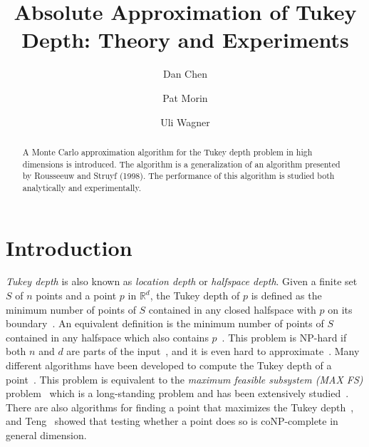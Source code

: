 \documentclass [letterpaper] {article}
\title{Absolute Approximation of Tukey Depth: \newline Theory and Experiments}
\author{Dan Chen \and Pat Morin \and Uli Wagner}
\date{}
\begin{document}
\maketitle


\begin{abstract}
  A Monte Carlo approximation algorithm for the Tukey depth problem in
  high dimensions is introduced. The algorithm is a generalization of
  an algorithm presented by Rousseeuw and Struyf (1998). The performance
  of this algorithm is studied both analytically and experimentally.
\end{abstract}


\section{Introduction}
\label{sec:intro}

\emph{Tukey depth} is also known as \emph{location depth} or \emph{halfspace depth}. Given a finite set $S$ of $n$ points and a point $p$ in $\mathbb{R}^{d}$, the Tukey depth of $p$ is defined as the minimum number of points of $S$ contained in any closed halfspace with $p$ on its boundary~\cite{Hodges,Tukey}. An equivalent definition is the minimum number of points of $S$ contained in any halfspace which also contains $p$~\cite{Bremner08}. This problem is NP-hard if both $n$ and $d$ are parts of the input~\cite{Johnson}, and it is even hard to approximate~\cite{Amaldi95}. Many different algorithms have been developed to compute the Tukey depth of a point~\cite{Bremner06, Bremner08, Rousseeuw98}. This problem is equivalent to the \emph{maximum feasible subsystem (MAX FS)} problem~\cite{Chen07} which is a long-standing problem and has been extensively studied~\cite[Chapter 7]{Chinneck08}. There are also algorithms for finding a point that maximizes the Tukey depth~\cite{Chan04, Langerman03, Matousek92}, and Teng~\cite{Teng91} showed that testing whether a point does so is coNP-complete in general dimension.
\end{document}
